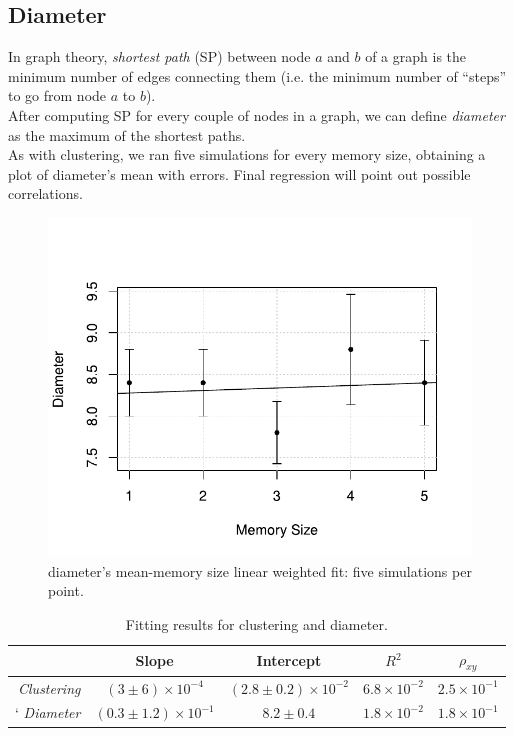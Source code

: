 \subsection{Diameter} \label{diameter}
In graph theory, \textit{shortest path}\cite{diameter} (SP)
between node $a$ and $b$ of a graph is the minimum number of
edges connecting them (i.e. the minimum number of ``steps'' to go
from node $a$ to $b$).\\
After computing SP for every couple of nodes in a graph, we can
define \textit{diameter}\cite{diameter} as the maximum of the
shortest paths.\\
As with clustering, we ran five simulations for every memory
size, obtaining a plot of diameter's mean with errors.
Final regression will point out possible correlations.
\begin{figure}[h]
  \centering
  \includegraphics[trim={0cm 0cm 0cm 1cm},clip,width=.8\columnwidth]{img/diameter.pdf}
  \caption{diameter's mean-memory size linear weighted fit: five simulations per point.}
  \label{fig:diameter}
\end{figure}
\begin{table}[h]
\label{tab:clusteringdiameter}
\centering
\begin{tabular}{r|cccc}
\toprule
& Slope & Intercept & $R^2$ & $\rho_{xy}$ \\
\midrule
\textit{Clustering} & $(3 \pm 6) \times 10^{-4}$ &$(2.8 \pm 0.2) \times 10^{-2}$ &$6.8 \times 10^{-2}$ & $2.5 \times 10^{-1}$ \\`
\textit{Diameter} & $(0.3 \pm 1.2) \times 10^{-1}$ & $8.2 \pm 0.4$ & $1.8 \times 10^{-2}$ & $1.8 \times 10^{-1}$  \\
\bottomrule
\end{tabular}
\caption{Fitting results for clustering and diameter.}
\end{table}
